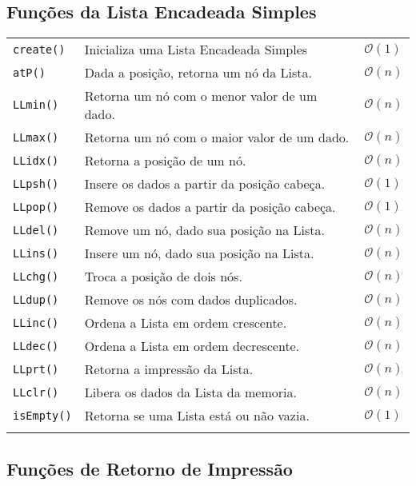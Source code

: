 \documentclass[12pt,a4paper]{article}
\numberwithin{figure}{section}
\numberwithin{table}{section}
\begin{document}
\subsection{Funções da Lista Encadeada Simples}

\begin{longtable}{p{3cm} p{11cm} p{1cm}}
	\texttt{create()} & Inicializa uma Lista Encadeada Simples & $\mathcal{O}(1)$ \\
	\texttt{atP()} & Dada a posição, retorna um nó da Lista. & $\mathcal{O}(n)$ \\
	\texttt{LLmin()} & Retorna um nó com o menor valor de um dado. & $\mathcal{O}(n)$ \\
	\texttt{LLmax()} & Retorna um nó com o maior valor de um dado. & $\mathcal{O}(n)$ \\
	\texttt{LLidx()} & Retorna a posição de um nó. & $\mathcal{O}(n)$ \\
	\texttt{LLpsh()} & Insere os dados a partir da posição cabeça. & $\mathcal{O}(1)$ \\
	\texttt{LLpop()} & Remove os dados a partir da posição cabeça. & $\mathcal{O}(1)$ \\
	\texttt{LLdel()} & Remove um nó, dado sua posição na Lista. & $\mathcal{O}(n)$ \\
	\texttt{LLins()} & Insere um nó, dado sua posição na Lista. & $\mathcal{O}(n)$ \\
	\texttt{LLchg()} & Troca a posição de dois nós. & $\mathcal{O}(n)$ \\
	\texttt{LLdup()} & Remove os nós com dados duplicados. & $\mathcal{O}(n)$ \\
	\texttt{LLinc()} & Ordena a Lista em ordem crescente. & $\mathcal{O}(n)$ \\
	\texttt{LLdec()} & Ordena a Lista em ordem decrescente. & $\mathcal{O}(n)$ \\
	\texttt{LLprt()} & Retorna a impressão da Lista. & $\mathcal{O}(n)$ \\
	\texttt{LLclr()} & Libera os dados da Lista da memoria. & $\mathcal{O}(n)$ \\
	\texttt{isEmpty()} & Retorna se uma Lista está ou não vazia. & $\mathcal{O}(1)$ \\
	\label{tab:lista}
\end{longtable}
\vspace{-0.5cm}

\subsection{Funções de Retorno de Impressão}
	
\end{document}

